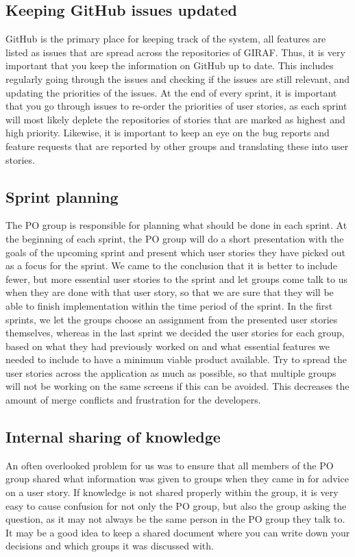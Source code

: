\subsection{Keeping GitHub issues updated}
GitHub is the primary place for keeping track of the system, all features are listed as issues that are spread across the repositories of GIRAF.
Thus, it is very important that you keep the information on GitHub up to date.
This includes regularly going through the issues and checking if the issues are still relevant, and updating the priorities of the issues. 
At the end of every sprint, it is important that you go through issues to re-order the priorities of user stories, as each sprint will most likely deplete the repositories of stories that are marked as highest and high priority.
Likewise, it is important to keep an eye on the bug reports and feature requests that are reported by other groups and translating these into user stories.

\subsection{Sprint planning}
The PO group is responsible for planning what should be done in each sprint.
At the beginning of each sprint, the PO group will do a short presentation with the goals of the upcoming sprint and present which user stories they have picked out as a focus for the sprint.
We came to the conclusion that it is better to include fewer, but more essential user stories to the sprint and let groups come talk to us when they are done with that user story, so that we are sure that they will be able to finish implementation within the time period of the sprint.
In the first sprints, we let the groups choose an assignment from the presented user stories themselves, whereas in the last sprint we decided the user stories for each group, based on what they had previously worked on and what essential features we needed to include to have a minimum viable product available.
Try to spread the user stories across the application as much as possible, so that multiple groups will not be working on the same screens if this can be avoided.
This decreases the amount of merge conflicts and frustration for the developers.

\subsection{Internal sharing of knowledge}
An often overlooked problem for us was to ensure that all members of the PO group shared what information was given to groups when they came in for advice on a user story.
If knowledge is not shared properly within the group, it is very easy to cause confusion for not only the PO group, but also the group asking the question, as it may not always be the same person in the PO group they talk to.
It may be a good idea to keep a shared document where you can write down your decisions and which groups it was discussed with.

